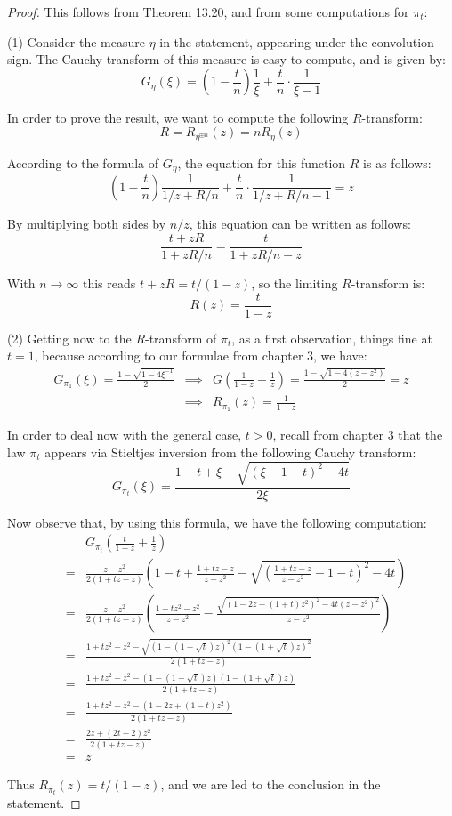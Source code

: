 \documentclass[12pt]{amsbook}
\begin{document}
\begin{proof}
This follows from Theorem 13.20, and from some computations for $\pi_t$:

\medskip

(1) Consider the measure $\eta$ in the statement, appearing under the convolution sign. The Cauchy transform of this measure is easy to compute, and is given by:
$$G_\eta(\xi)=\left(1-\frac{t}{n}\right)\frac{1}{\xi}+\frac{t}{n}\cdot\frac{1}{\xi-1}$$

In order to prove the result, we want to compute the following $R$-transform:
$$R
=R_{\eta^{\boxplus n}}(z)
=nR_\eta(z)$$

According to the formula of $G_\eta$, the equation for this function $R$ is as follows:
$$\left(1-\frac{t}{n}\right)\frac{1}{1/z+R/n}+\frac{t}{n}\cdot\frac{1}{1/z+R/n-1}=z$$

By multiplying both sides by $n/z$, this equation can be written as follows:
$$\frac{t+zR}{1+zR/n}=\frac{t}{1+zR/n-z}$$

With $n\to\infty$ this reads $t+zR=t/(1-z)$, so the limiting $R$-transform is:
$$R(z)=\frac{t}{1-z}$$

(2) Getting now to the $R$-transform of $\pi_t$, as a first observation, things fine at $t=1$, because according to our formulae from chapter 3, we have:
\begin{eqnarray*}
G_{\pi_1}(\xi)=\frac{1-\sqrt{1-4\xi^{-1}}}{2}
&\implies&G\left(\frac{1}{1-z}+\frac{1}{z}\right)=\frac{1-\sqrt{1-4(z-z^2)}}{2}=z\\
&\implies&R_{\pi_1}(z)=\frac{1}{1-z}
\end{eqnarray*}

In order to deal now with the general case, $t>0$, recall from chapter 3 that the law $\pi_t$ appears via Stieltjes inversion from the following Cauchy transform:
$$G_{\pi_t}(\xi)
=\frac{1-t+\xi-\sqrt{(\xi-1-t)^2-4t}}{2\xi}$$

Now observe that, by using this formula, we have the following computation:
\begin{eqnarray*}
&&G_{\pi_t}\left(\frac{t}{1-z}+\frac{1}{z}\right)\\
&=&\frac{z-z^2}{2(1+tz-z)}\left(1-t+\frac{1+tz-z}{z-z^2}
-\sqrt{\left(\frac{1+tz-z}{z-z^2}-1-t\right)^2-4t}\right)\\
&=&\frac{z-z^2}{2(1+tz-z)}\left(\frac{1+tz^2-z^2}{z-z^2}
-\frac{\sqrt{\left(1-2z+(1+t)z^2\right)^2-4t(z-z^2)^2}}{z-z^2}\right)\\
&=&\frac{1+tz^2-z^2-\sqrt{\left(1-(1-\sqrt{t})z\right)^2\left(1-(1+\sqrt{t})z\right)^2}}{2(1+tz-z)}\\
&=&\frac{1+tz^2-z^2-\left(1-(1-\sqrt{t})z\right)\left(1-(1+\sqrt{t})z\right)}{2(1+tz-z)}\\
&=&\frac{1+tz^2-z^2-(1-2z+(1-t)z^2)}{2(1+tz-z)}\\
&=&\frac{2z+(2t-2)z^2}{2(1+tz-z)}\\
&=&z
\end{eqnarray*}

Thus $R_{\pi_t}(z)=t/(1-z)$, and we are led to the conclusion in the statement.
\end{proof}
\end{document}
